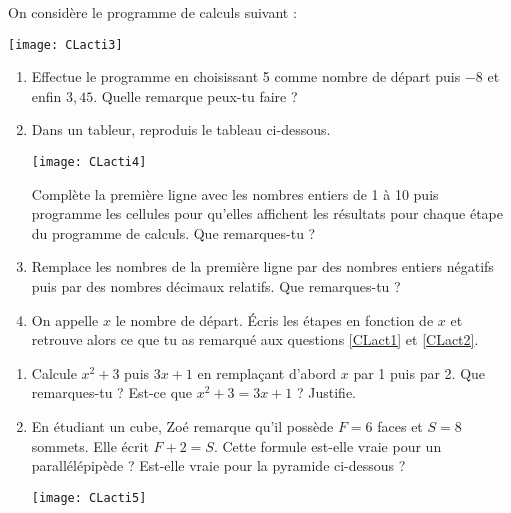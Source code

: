 \begin{activite}

On considère le programme de calculs suivant :

\begin{center}
    \texttt{[image: CLacti3]}
\end{center}

\begin{enumerate}

\item Effectue le programme en choisissant 5 comme nombre de départ puis $-8$ et enfin $3,45$. Quelle remarque peux-tu faire ?
\item\label{CLact1} Dans un tableur, reproduis le tableau ci-dessous.

\begin{center}
    \texttt{[image: CLacti4]}
\end{center}

Complète la première ligne avec les nombres entiers de 1 à 10 puis programme les cellules pour qu'elles affichent les résultats pour chaque étape du programme de calculs. Que remarques-tu ?
\item\label{CLact2} Remplace les nombres de la première ligne par des nombres entiers négatifs puis par des nombres décimaux relatifs. Que remarques-tu ?
\item On appelle $x$ le nombre de départ. Écris les étapes en fonction de $x$ et retrouve alors ce que tu as remarqué aux questions \ref{CLact1} et \ref{CLact2}.
\end{enumerate}
\end{activite}



\begin{activite}

\begin{enumerate}
\item Calcule $x^2 + 3$ puis $3x + 1$ en remplaçant d'abord $x$ par 1 puis par 2. Que remarques-tu ? Est-ce que  $x^2 + 3 = 3x + 1$ ? Justifie.
\item En étudiant un cube, Zoé remarque qu'il possède $F = 6$ faces et $S = 8$ sommets. Elle écrit $F + 2 = S$. Cette formule est-elle vraie pour un parallélépipède ? Est-elle vraie pour la pyramide ci-dessous ?

\begin{center}
    \texttt{[image: CLacti5]}
\end{center}

\end{enumerate}
\end{activite}




